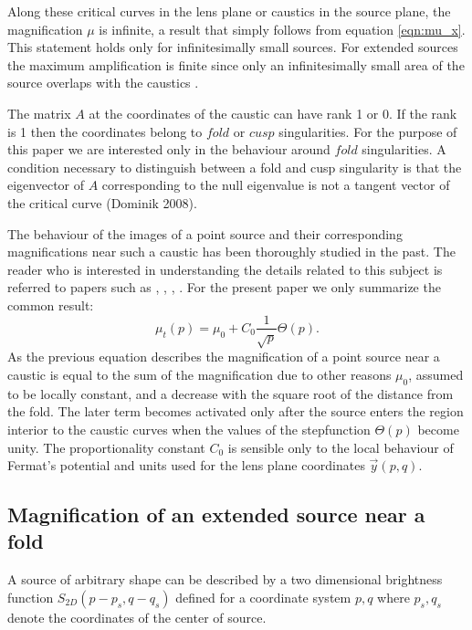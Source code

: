 Along these critical curves in the lens plane or caustics in the source plane,  the magnification $\mu$ is infinite, a result that simply follows from equation \ref{eqn:mu_x}. This statement holds only for infinitesimally small sources. For extended sources the maximum amplification is finite since only an infinitesimally small area of the source
overlaps with the caustics \citep{1986BAAS...18T.907S}. 

The matrix $A$ at the coordinates of the caustic can have rank 1 or 0. If the rank is 1 then the coordinates belong to $fold$ or $cusp$ singularities. For the purpose 
of this paper we are interested only in the behaviour around $fold$ singularities. A condition necessary to distinguish between a fold and cusp singularity is that the
eigenvector of $A$ corresponding to the null eigenvalue is not a tangent vector of the critical curve \citep{1992A&A...260....1S}(Dominik 2008).


The behaviour of the images of a point source and their corresponding magnifications near such a caustic has been thoroughly studied in the past. The reader who is interested in 
understanding the details related to this subject is referred to papers such as \cite{1986ApJ...310..568B}, \cite{1992A&A...260....1S}, \cite{2002ApJ...574..970G}, \cite{2002ApJ...580..468G}. For the present paper we only 
summarize the common result:
\begin {equation}
 \mu_{t}(p) = \mu_0 + C_0 \frac{1}{\sqrt{p}} \Theta(p).
\end {equation}
As the previous equation describes the magnification of a point source near a caustic is equal to the sum of the magnification due to other reasons $\mu_0$, assumed to be locally constant,  and a decrease with
the square root of the distance from the fold. The later term becomes activated only after the source enters the region interior to the caustic curves when the values of the stepfunction $\Theta(p)$ become unity. The proportionality
constant $C_0$  is sensible only to the local behaviour of Fermat's potential and units used for the lens plane coordinates $\vec{y}(p,q)$. 

\subsection{Magnification of an extended source near a fold}

A source of arbitrary shape can be described by a two dimensional brightness function $S_{2D}(p - p_s, q - q_s)$ defined for a coordinate system $p,q$ where $p_s, q_s$ denote the coordinates of the center of source.

